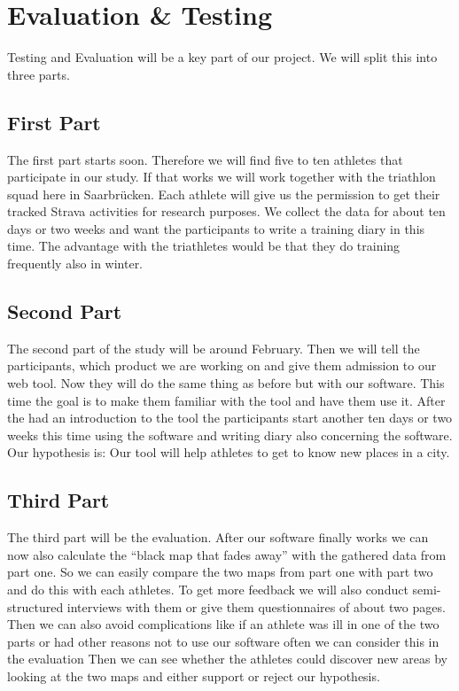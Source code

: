 \documentclass{sigchi}
\begin{document}
\section{Evaluation \& Testing}
Testing and Evaluation will be a key part of our project. We will split this into three parts. 
\subsection{First Part}
The first part starts soon. Therefore we will find five to ten athletes that participate in our study. If that works we will work together with the triathlon squad here in Saarbrücken. Each athlete will give us the permission to get their tracked Strava activities for research purposes. We collect the data for about ten days or two weeks and want the participants to write a training diary in this time. The advantage with the triathletes would be that they do training frequently also in winter. 
\subsection{Second Part}
The second part of the study will be around February. Then we will tell the participants, which product we are working on and give them admission to our web tool. Now they will do the same thing as before but with our software. This time the goal is to make them familiar with the tool and have them use it. After the had an introduction to the tool the participants start another ten days or two weeks this time using the software and writing diary also concerning the software. 
Our hypothesis is: Our tool will help athletes to get to know new places in a city.
\subsection{Third Part}
The third part will be the evaluation. After our software finally works we can now also calculate the “black map that fades away” with the gathered data from part one. So we can easily compare the two maps from part one with part two and do this with each athletes. 
To get more feedback we will also conduct semi-structured interviews with them or give them questionnaires of about two pages. Then we can also avoid complications like if an athlete was ill in one of the two parts or had other reasons not to use our software often we can consider this in the evaluation
Then we can see whether the athletes could discover new areas by looking at the two maps and either support or reject our hypothesis.

\balance{}



\end{document}
